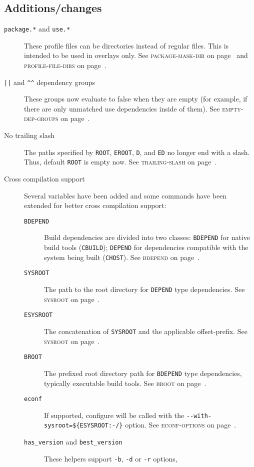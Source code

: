 \documentclass[a4paper,nofoldmark]{leaflet}
\newcommand{\code}[1]{\texttt{#1}}
\newcommand{\featureref}[1]{\textsc{#1} on page~\pageref{feat:#1}}
\begin{document}
\subsection{Additions/changes}
\label{sec:cs:eapi7-additions}
\begin{description}
    \item[\code{package.*} and \code{use.*}] These profile files can
    be directories instead of regular files. This is intended to be
    used in overlays only.
    See \featureref{package-mask-dir} and \featureref{profile-file-dirs}.
    \item[\code{||} and \code{\textasciicircum\textasciicircum}
    dependency groups] These groups now evaluate to false when they
    are empty (for example, if there are only unmatched use
    dependencies inside of them).
    See \featureref{empty-dep-groups}.
    \item[No trailing slash] The paths specified by \code{ROOT},
    \code{EROOT}, \code{D}, and \code{ED} no longer end with a slash.
    Thus, default \code{ROOT} is empty now.
    See \featureref{trailing-slash}.
    \item[Cross compilation support] Several variables have been added
    and some commands have been extended for better cross compilation
    support:
    \begin{description}
        \item[\code{BDEPEND}] Build dependencies are divided into two
        classes: \code{BDEPEND} for native build tools (\code{CBUILD});
        \code{DEPEND} for dependencies compatible with the system
        being built (\code{CHOST}).
        See \featureref{bdepend}.
        \item[\code{SYSROOT}] The path to the root directory for
        \code{DEPEND} type dependencies.
        See \featureref{sysroot}.
        \item[\code{ESYSROOT}] The concatenation of \code{SYSROOT} and
        the applicable offset-prefix. See \featureref{sysroot}.
        \item[\code{BROOT}] The prefixed root directory path for
        \code{BDEPEND} type dependencies, typically executable build
        tools.
        See \featureref{broot}.
        \item[\code{econf}] If supported, configure will be called
        with the \code{-{}-with-sysroot=\$\{ESYSROOT:-/\}} option.
        See \featureref{econf-options}.
        \item[\code{has_version} and \code{best_version}] These
        helpers support \code{-b}, \code{-d} or \code{-r} options,

\end{description}
\end{description}
\end{document}
